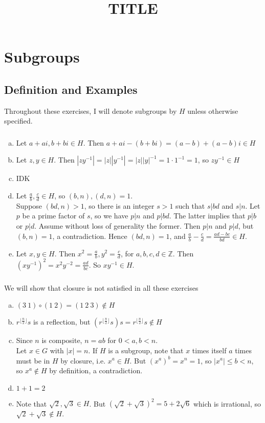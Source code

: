 \documentclass{article}
\title{TITLE}
\newcommand{\ints}{\mathbb{Z}}
\newcommand{\inv}[1]{ {#1}^{-1} }
\newcommand{\comp}{ \circ }
\newcommand{\floor}[1]{\lfloor #1 \rfloor}
\begin{document}
\tableofcontents 
\setcounter{section}{1} 
\section{Subgroups}  

\subsection{Definition and Examples}
Throughout these exercises, I will denote subgroups by $H$ unless otherwise specified.
\subsubsection{}\label{ex1p1}
\begin{enumerate}[(a)]
\item Let $a+ai,b+bi \in H$. Then $a+ai-(b+bi) = (a-b) + (a-b)i \in H$
\item Let $z,y \in H$. Then $|z\inv{y}| = |z||\inv{y}| = |z|\inv{|y|} = 1\cdot \inv{1} = 1$, so $z\inv{y} \in H$
\item IDK %
\item Let $\frac{a}{b}, \frac{c}{d} \in H$, so $(b,n),(d,n)=1$.\\
Suppose $(bd,n) > 1$, so there is an integer $s>1$ such that $s|bd$ and $s|n$. Let $p$ be a prime factor of $s$, so we have $p|n$ and $p|bd$. The latter implies that $p|b$ or $p|d$. Assume without loss of generality the former. Then $p|n$ and $p|d$, but $(b,n)=1$, a contradiction. Hence $(bd,n)=1$, and $\frac{a}{b}-\frac{c}{d} = \frac{ad-bc}{bd} \in H$.
\item Let $x,y \in H$. Then $x^2=\frac{a}{b}, y^2=\frac{c}{d}$, for $a,b,c,d \in \ints$. Then $(x\inv{y})^2 = x^2y^{-2}=\frac{ad}{bc}$. So $x\inv{y}\in H$.
\end{enumerate}
\subsubsection{}\label{ex1p2}
We will show that closure is not satisfied in all these exercises
\begin{enumerate}[(a)]
\item $(3\ 1)\comp(1\ 2) = (1\ 2\ 3) \notin H$
\newcommand{\lereflect}{r^{\floor{\frac{n}{2}}}s}
\item $\lereflect$ is a reflection, but $(\lereflect)s = \lereflect \notin H$
\item Since $n$ is composite, $n=ab$ for $0<a,b<n$.\\
Let $x\in G$ with $|x|=n$. If $H$ is a subgroup, note that $x$ times itself $a$ times must be in $H$ by closure, i.e. $x^a \in H$. But $(x^a)^b = x^n = 1$, so $|x^a| \leq b < n$, so $x^a \notin H$ by definition, a contradiction.
\item $1+1=2$
\item Note that $\sqrt{2},\sqrt{3}\in H$. But $(\sqrt{2}+\sqrt{3})^2  = 5 + 2\sqrt{6}$ which is irrational, so $\sqrt{2}+\sqrt{3} \notin H$.
\end{enumerate}
\end{document}
